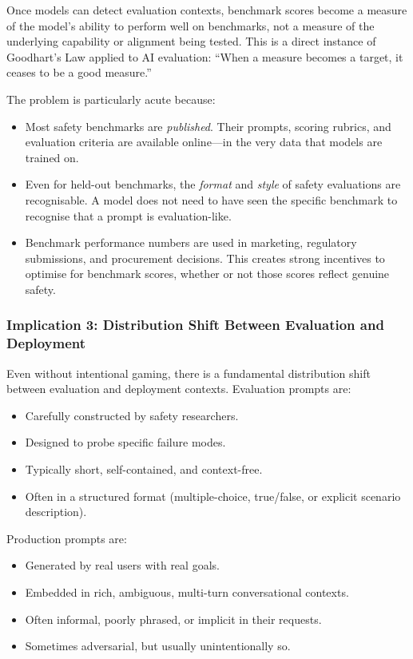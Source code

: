 \documentclass[11pt, a4paper]{article}
\begin{document}
Once models can detect evaluation contexts, benchmark scores become a measure of the model's ability to perform well on benchmarks, not a measure of the underlying capability or alignment being tested. This is a direct instance of Goodhart's Law applied to AI evaluation: ``When a measure becomes a target, it ceases to be a good measure.''

The problem is particularly acute because:
\begin{itemize}
  \item Most safety benchmarks are \emph{published}. Their prompts, scoring rubrics, and evaluation criteria are available online---in the very data that models are trained on.
  \item Even for held-out benchmarks, the \emph{format} and \emph{style} of safety evaluations are recognisable. A model does not need to have seen the specific benchmark to recognise that a prompt is evaluation-like.
  \item Benchmark performance numbers are used in marketing, regulatory submissions, and procurement decisions. This creates strong incentives to optimise for benchmark scores, whether or not those scores reflect genuine safety.
\end{itemize}

\subsubsection{Implication 3: Distribution Shift Between Evaluation and Deployment}

Even without intentional gaming, there is a fundamental distribution shift between evaluation and deployment contexts. Evaluation prompts are:
\begin{itemize}
  \item Carefully constructed by safety researchers.
  \item Designed to probe specific failure modes.
  \item Typically short, self-contained, and context-free.
  \item Often in a structured format (multiple-choice, true/false, or explicit scenario description).
\end{itemize}

Production prompts are:
\begin{itemize}
  \item Generated by real users with real goals.
  \item Embedded in rich, ambiguous, multi-turn conversational contexts.
  \item Often informal, poorly phrased, or implicit in their requests.
  \item Sometimes adversarial, but usually unintentionally so.
\end{itemize}
\end{document}

